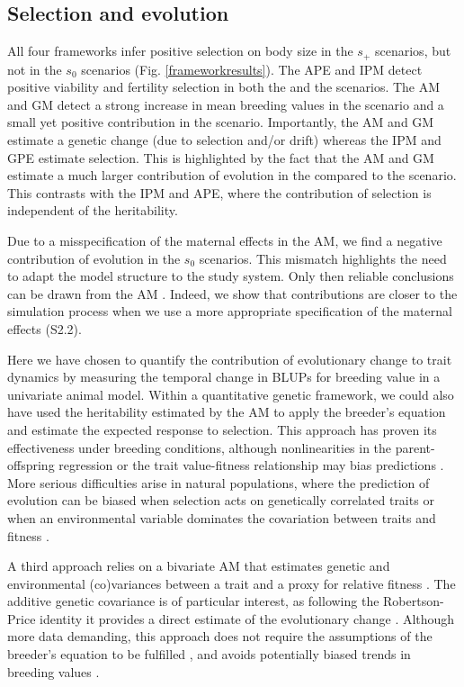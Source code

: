 \subsection*{Selection and evolution}
All four frameworks infer positive selection on body size in the $s_+$ scenarios, but not in the $s_0$ scenarios (Fig. \ref{frameworkresults}). The APE and IPM detect positive viability and fertility selection in both the \SH and the \Sh scenarios. The AM and GM detect a strong increase in mean breeding values in the \SH scenario and a small yet positive contribution in the \Sh scenario. Importantly, the AM and GM estimate a genetic change (due to selection and/or drift) whereas the IPM and GPE estimate selection. This is highlighted by the fact that the AM and GM estimate a much larger contribution of evolution in the \SH compared to the \Sh scenario. This contrasts with the IPM and APE, where the contribution of selection is independent of the heritability. 

Due to a misspecification of the maternal effects in the AM, we find a negative contribution of evolution in the $s_0$ scenarios. This mismatch highlights the need to adapt the model structure to the study system. Only then reliable conclusions can be drawn from the AM \parencite[see also][]{Hadfield2011}. Indeed, we show that contributions are closer to the simulation process when we use a more appropriate specification of the maternal effects (S2.2). 

Here we have chosen to quantify the contribution of evolutionary change to trait dynamics by measuring the temporal change in BLUPs for breeding value in a univariate animal model. Within a quantitative genetic framework, we could also have used the heritability estimated by the AM to apply the breeder's equation and estimate the expected response to selection. This approach has proven its effectiveness under breeding conditions, although nonlinearities in the parent-offspring regression or the trait value-fitness relationship may bias predictions \parencite{Heywood2005}. More serious difficulties arise in natural populations, where the prediction of evolution can be biased when selection acts on genetically correlated traits or when an environmental variable dominates the covariation between traits and fitness \parencite{Rausher1992,Morrissey2010}.

A third approach relies on a bivariate AM that estimates genetic and environmental (co)variances between a trait and a proxy for relative fitness \parencite{Lande1979,Lynch2014}. The additive genetic covariance is of particular interest, as following the Robertson-Price identity it provides a direct estimate of the evolutionary change \parencite{Robertson1966,Price1970,Lynch2014}. Although more data demanding, this approach does not require the assumptions of the breeder's equation to be fulfilled \parencite{Morrissey2012}, and avoids potentially biased trends in breeding values \parencite{Postma2006}.

